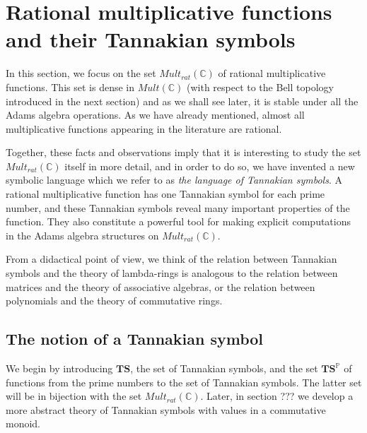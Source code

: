 \documentclass[a4paper]{article}
\theoremstyle{definition}
\theoremstyle{remark}
\newcommand{\C}{\mathbb{C}}
\newcommand{\TS}{\mathbf{TS}}
\newcommand{\TSP}{\mathbf{TS}^{\mathbb{P}}}
\begin{document}
\section{Rational multiplicative functions and their Tannakian symbols} \label{sec:TannakianSymbols}

In this section, we focus on the set $Mult_{rat}(\C)$ of rational multiplicative functions. This set is dense in $Mult(\C)$ (with respect to the Bell topology introduced in the next section) and as we shall see later, it is stable under all the Adams algebra operations. As we have already mentioned, almost all multiplicative functions appearing in the literature are rational. 

Together, these facts and observations imply that it is interesting to study the set $Mult_{rat}(\C)$ itself in more detail, and in order to do so, we have invented a new symbolic language which we refer to as \emph{the language of Tannakian symbols}. A rational multiplicative function has one Tannakian symbol for each prime number, and these Tannakian symbols reveal many important properties of the function. They also constitute a powerful tool for making explicit computations in the Adams algebra structures on $Mult_{rat}(\C)$. 

From a didactical point of view, we think of the relation between Tannakian symbols and the theory of lambda-rings is analogous to the relation between matrices and the theory of associative algebras, or the relation between polynomials and the theory of commutative rings.




\subsection{The notion of a Tannakian symbol}

We begin by introducing $\TS$, the set of Tannakian symbols, and the set $\TSP$ of functions from the prime numbers to the set of Tannakian symbols. The latter set will be in bijection with the set $Mult_{rat}(\C)$. Later, in section ??? we develop a more abstract theory of Tannakian symbols with values in a commutative monoid. 
\end{document}
